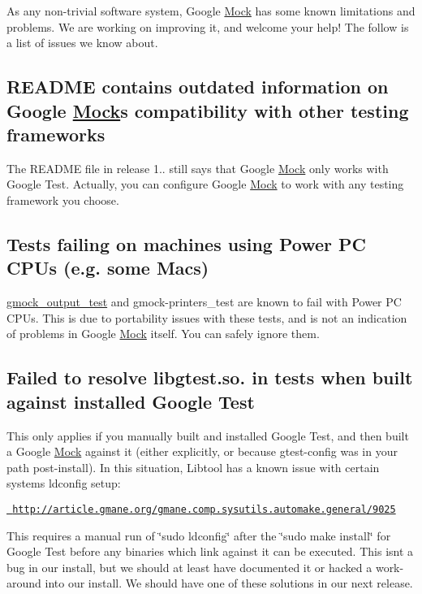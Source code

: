 As any non-\/trivial software system, Google \mbox{\hyperlink{class_mock}{Mock}} has some known limitations and problems. We are working on improving it, and welcome your help! The follow is a list of issues we know about.

\subsection*{R\+E\+A\+D\+ME contains outdated information on Google \mbox{\hyperlink{class_mock}{Mock}}\textquotesingle{}s compatibility with other testing frameworks}

The {\ttfamily R\+E\+A\+D\+ME} file in release 1.. still says that Google \mbox{\hyperlink{class_mock}{Mock}} only works with Google Test. Actually, you can configure Google \mbox{\hyperlink{class_mock}{Mock}} to work with any testing framework you choose.

\subsection*{Tests failing on machines using Power PC C\+P\+Us (e.\+g. some Macs)}

{\ttfamily \mbox{\hyperlink{namespacegmock__output__test}{gmock\+\_\+output\+\_\+test}}} and {\ttfamily gmock-\/printers\+\_\+test} are known to fail with Power PC C\+P\+Us. This is due to portability issues with these tests, and is not an indication of problems in Google \mbox{\hyperlink{class_mock}{Mock}} itself. You can safely ignore them.

\subsection*{Failed to resolve libgtest.\+so. in tests when built against installed Google Test}

This only applies if you manually built and installed Google Test, and then built a Google \mbox{\hyperlink{class_mock}{Mock}} against it (either explicitly, or because gtest-\/config was in your path post-\/install). In this situation, Libtool has a known issue with certain systems\textquotesingle{} ldconfig setup\+:

\href{http://article.gmane.org/gmane.comp.sysutils.automake.general/9025}{\texttt{ http\+://article.\+gmane.\+org/gmane.\+comp.\+sysutils.\+automake.\+general/9025}}

This requires a manual run of \char`\"{}sudo ldconfig\char`\"{} after the \char`\"{}sudo make install\char`\"{} for Google Test before any binaries which link against it can be executed. This isn\textquotesingle{}t a bug in our install, but we should at least have documented it or hacked a work-\/around into our install. We should have one of these solutions in our next release. 